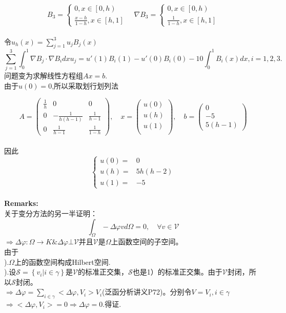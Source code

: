 \documentclass[a4paper,11pt,UTF8]{article}%
\theoremstyle{plain}
\begin{document}
\indent 
$$B_3=\left\{
\begin{aligned}
	0,x\in\left[0,h\right)\\
	\frac{x-h}{1-h},x\in \left[h,1\right]
\end{aligned}		
\right.\quad
\nabla B_3=\left\{
\begin{aligned}
	0,x\in\left[0,h\right)\\
	\frac{1}{1-h},x\in \left[h,1\right]
\end{aligned}\right.$$\\
令$u_h\left(x\right)=\sum_{j=1}^{3}u_jB_j\left(x\right)$\\
$$\sum_{j=1}^{3}\int_{0}^{1}\nabla B_j\cdot\nabla B_idxu_j=u'\left(1\right)B_i\left(1\right)-u'\left(0\right)B_i\left(0\right)-10\int_{0}^{1}B_i\left(x\right)dx,i=1,2,3.$$
问题变为求解线性方程组$Ax=b$.\\
由于$u\left(0\right)=0$,所以采取划行划列法

$$A=\begin{pmatrix}
 \frac{1}{h}&0&0\\
 0&-\frac{1}{h\left(h-1\right)}&\frac{1}{h-1}\\
 0&\frac{1}{h-1}&\frac{1}{1-h}
\end{pmatrix},\quad
x=\begin{pmatrix}
	u\left(0\right)\\
	u\left(h\right)\\
	u\left(1\right)\\
\end{pmatrix},
\quad b=\begin{pmatrix}
	0\\
	-5\\
	5\left(h-1\right)
\end{pmatrix}$$\\
因此$$\left\{
\begin{aligned}
	u\left(0\right)=&0\\
	u\left(h\right)=&5h\left(h-2\right)\\
	u\left(1\right)=&-5
\end{aligned}\right.$$\\
\textbf{Remarks:}\\
关于变分方法的另一半证明：\\
$$\int_{\Omega}-\Delta \varphi vd\Omega=0 , \quad \forall v\in \mathcal{V}$$
$\Rightarrow \Delta \varphi:\Omega\rightarrow K \& \Delta \varphi \bot \mathcal{V}$并且$\mathcal{V}$是$\Omega$上函数空间的子空间。\\
由于\\
\indent {}).$\Omega$上的函数空间构成Hilbert空间.\\
\indent {}).设$\mathcal{S}=\left\{v_i| i\in \gamma \right\}$是$\mathcal{V}$的标准正交集，$\mathcal{S}$也是1）的标准正交集。由于$\mathcal{V}$封闭，所以$\mathcal{S}$封闭。\\
$\Rightarrow\Delta\varphi=\sum_{i\in \gamma }<\Delta\varphi ,V_i>V_i$(泛函分析讲义P72)。分别令$V=V_i,i\in \gamma $$\Rightarrow<\Delta\varphi,V_i>=0$$\Rightarrow\Delta \varphi =0$.得证.
\end{document}
